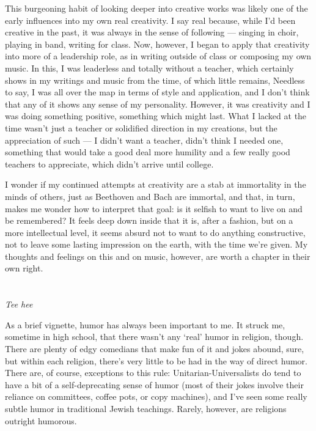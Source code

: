 \documentclass{book}
\begin{document}
This burgeoning habit of looking deeper into creative works was likely one of the early influences into my own real creativity.  I say real because, while I'd been creative in the past, it was always in the sense of following --- singing in choir, playing in band, writing for class.  Now, however, I began to apply that creativity into more of a leadership role, as in writing outside of class or composing my own music.  In this, I was leaderless and totally without a teacher, which certainly shows in my writings and music from the time, of which little remains, Needless to say, I was all over the map in terms of style and application, and I don't think that any of it shows any sense of my personality.  However, it was creativity and I was doing something positive, something which might last.  What I lacked at the time wasn't just a teacher or solidified direction in my creations, but the appreciation of such --- I didn't want a teacher, didn't think I needed one, something that would take a good deal more humility and a few really good teachers to appreciate, which didn't arrive until college.

I wonder if my continued attempts at creativity are a stab at immortality in the minds of others, just as Beethoven and Bach are immortal, and that, in turn, makes me wonder how to interpret that goal: is it selfish to want to live on and be remembered? It feels deep down inside that it is, after a fashion, but on a more intellectual level, it seems absurd not to want to do anything constructive, not to leave some lasting impression on the earth, with the time we're given.  My thoughts and feelings on this and on music, however, are worth a chapter in their own right.

\chapter{}
\begin{center}
	\emph{Tee hee}
\end{center}

As a brief vignette, humor has always been important to me.  It struck me, sometime in high school, that there wasn't any `real' humor in religion, though.  There are plenty of edgy comedians that make fun of it and jokes abound, sure, but within each religion, there's very little to be had in the way of direct humor.  There are, of course, exceptions to this rule: Unitarian-Universalists do tend to have a bit of a self-deprecating sense of humor (most of their jokes involve their reliance on committees, coffee pots, or copy machines), and I've seen some really subtle humor in traditional Jewish teachings.  Rarely, however, are religions outright humorous.
\end{document}
